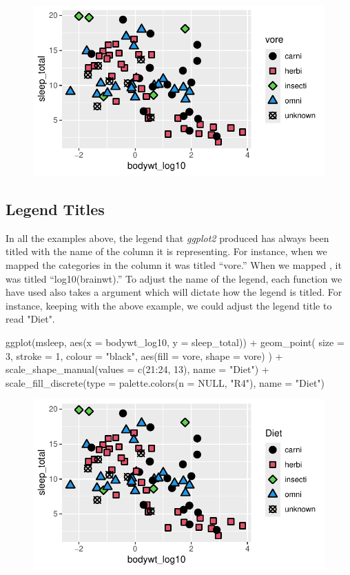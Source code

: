 \begin{figure}[H]
\includegraphics[scale = .75]{graphics/ch2Figs/ggEx_30.pdf}
\end{figure}

\subsection{Legend Titles}

In all the examples above, the legend that \textit{ggplot2} produced has always been titled with the name of the column it is representing. For instance, when we mapped the categories in the  column it was titled ``vore.'' When we mapped , it was titled ``log10(brainwt).'' To adjust the name of the legend, each  function we have used also takes a  argument which will dictate how the legend is titled. For instance, keeping with the above example, we could adjust the legend title to read "Diet".

\begin{inR}
ggplot(msleep, aes(x = bodywt_log10, y = sleep_total)) +
  geom_point(
    size = 3, stroke = 1, colour = "black",
    aes(fill = vore, shape = vore)
  ) +
  scale_shape_manual(values = c(21:24, 13), name = "Diet") +
  scale_fill_discrete(type = palette.colors(n = NULL, "R4"), name = "Diet")
\end{inR}

\vspace{2em}

\begin{figure}[H]
\includegraphics[scale = .75]{graphics/ch2Figs/ggEx_31.pdf}
\end{figure}


